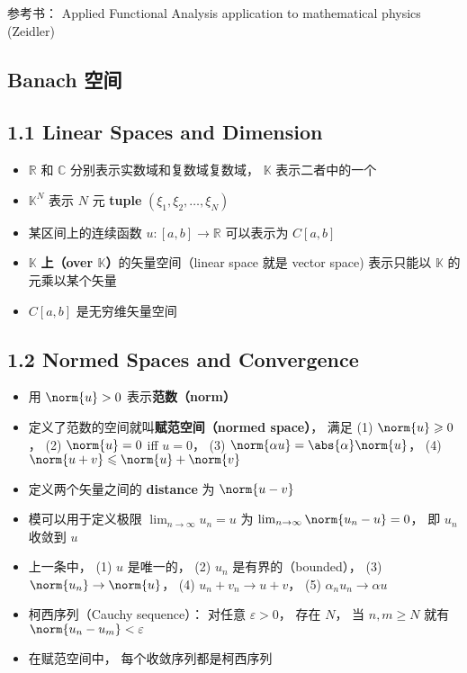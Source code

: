 
参考书： Applied Functional Analysis application to mathematical physics (Zeidler)

\subsection{Banach 空间}

\subsection{1.1 Linear Spaces and Dimension}
\begin{itemize}
\item $\mathbb R$ 和 $\mathbb C$ 分别表示实数域和复数域复数域， $\mathbb K$ 表示二者中的一个

\item $\mathbb K^N$ 表示 $N$ 元 \textbf{tuple} $(\xi_1, \xi_2, \dots, \xi_N)$

\item 某区间上的连续函数 $u:[a, b] \to \mathbb{R}$ 可以表示为 $C[a, b]$

\item $\mathbb{K}$ \textbf{上（over $\mathbb K$）}的矢量空间（linear space 就是 vector space) 表示只能以 $\mathbb K$ 的元乘以某个矢量

\item $C[a, b]$ 是无穷维矢量空间
\end{itemize}

\subsection{1.2 Normed Spaces and Convergence}
\begin{itemize}
\item 用 $\norm{u} > 0$ 表示\textbf{范数（norm）}

\item 定义了范数的空间就叫\textbf{赋范空间（normed space）}， 满足 (1) $\norm{u} \geqslant 0$， (2) $\norm{u} = 0$ iff $u = 0$， (3) $\norm{\alpha u} = \abs{\alpha} \norm{u}$， (4) $\norm{u + v} \leqslant \norm{u} + \norm{v}$

\item 定义两个矢量之间的 \textbf{distance} 为 $\norm{u - v}$

\item 模可以用于定义极限 $\lim_{n\to\infty} u_n = u$ 为 $\lim_{n\to\infty} \norm{u_n - u} = 0$， 即 $u_n$ 收敛到 $u$

\item 上一条中， (1) $u$ 是唯一的， (2) $u_n$ 是有界的（bounded）， (3) $\norm{u_n} \to \norm{u}$， (4) $u_n + v_n \to u + v$， (5) $\alpha_n u_n \to \alpha u$

\item 柯西序列（Cauchy sequence）： 对任意 $\varepsilon > 0$， 存在 $N$， 当 $n, m \geqslant N$ 就有 $\norm{u_n - u_m} < \varepsilon$

\item 在赋范空间中， 每个收敛序列都是柯西序列
\end{itemize}

